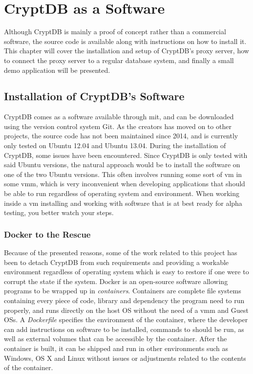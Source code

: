 \chapter{CryptDB as a Software}
\label{chp:software}

Although CryptDB is mainly a proof of concept rather than a commercial software, the source code is available along with instructions on how to install it. This chapter will cover the installation and setup of CryptDB's proxy server, how to connect the proxy server to a regular database system, and finally a small demo application will be presented.

\section{Installation of CryptDB's Software}

CryptDB comes as a software available through \gls{mit}, and can be downloaded using the version control system Git. As the creators has moved on to other projects, the source code has not been maintained since 2014, and is currently only tested on Ubuntu 12.04 and Ubuntu 13.04. During the installation of CryptDB, some issues have been encountered. Since CryptDB is only tested with said Ubuntu versions, the natural approach would be to install the software on one of the two Ubuntu versions. This often involves running some sort of \gls{vm} in some \gls{vmm}, which is very inconvenient when developing applications that should be able to run regardless of operating system and environment. When working inside a \gls{vm} installing and working with software that is at best ready for alpha testing, you better watch your steps. 

\subsection{Docker to the Rescue}


Because of the presented reasons, some of the work related to this project has been to detach CryptDB from such requirements and providing a workable environment regardless of operating system which is easy to restore if one were to corrupt the state if the system. Docker \cite{docker_homepage} is an open-source software allowing programs to be wrapped up in \emph{containers}. Containers are complete file systems containing every piece of code, 
library and dependency the program need to run properly, and runs directly on the host OS without the need of a \gls{vmm} and Guest OSs. A \emph{Dockerfile} specifies the environment of the container, where the developer can add instructions on software to be installed, commands to should be run, as well as external volumes that can be accessible by the container. After the container is built, it can be shipped and run in other environments such as Windows, OS X and Linux without issues or adjustments related to the contents of the container.


